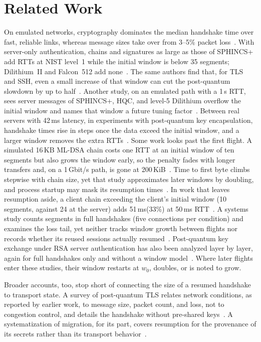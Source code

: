 \documentclass[sigconf,9pt,nonacm]{acmart}
\newcommand{\ms}{\,ms\xspace}
\begin{document}
\section{Related Work}\label{sec:related}
On emulated networks, cryptography dominates the median handshake time over fast, reliable links, whereas message sizes take over from 3--5\% packet loss~\cite{paquin2020}. With server-only authentication, chains and signatures as large as those of SPHINCS+ add RTTs at NIST level~1 while the initial window is below 35 segments; Dilithium~II and Falcon~512 add none~\cite{sikeridis2020}. The same authors find that, for TLS and SSH, even a small increase of that window can cut the post-quantum slowdown by up to half~\cite{sikeridis2020conext}. Another study, on an emulated path with a 1\,s RTT, sees server messages of SPHINCS+, HQC, and level-5 Dilithium overflow the initial window and names that window a future tuning factor~\cite{sosnowski2023}. Between real servers with 42\ms latency, in experiments with post-quantum key encapsulation, handshake times rise in steps once the data exceed the initial window, and a larger window removes the extra RTTs~\cite{henrich2025}. Some work looks past the first flight. A simulated 16\,KB ML-DSA chain costs one RTT at an initial window of ten segments but also grows the window early, so the penalty fades with longer transfers and, on a 1\,Gbit/s path, is gone at 200\,KiB~\cite{kampanakis2024}. Time to first byte climbs stepwise with chain size, yet that study approximates later windows by doubling, and process startup may mask its resumption times~\cite{chou2026}. In work that leaves resumption aside, a client chain exceeding the client's initial window (10 segments, against 24 at the server) adds 51\ms (33\%) at 50\ms RTT~\cite{anastasova2025}. A systems study counts segments in full handshakes (five connections per condition) and examines the loss tail, yet neither tracks window growth between flights nor records whether its reused sessions actually resumed~\cite{dubetskyy2026}. Post-quantum key exchange under RSA server authentication has also been analyzed layer by layer, again for full handshakes only and without a window model~\cite{gomez2026}. Where later flights enter these studies, their window restarts at $w_0$, doubles, or is noted to grow.

Broader accounts, too, stop short of connecting the size of a resumed handshake to transport state. A survey of post-quantum TLS relates network conditions, as reported by earlier work, to message size, packet count, and loss, not to congestion control, and details the handshake without pre-shared keys~\cite{alnahawi2024}. A systematization of migration, for its part, covers resumption for the provenance of its secrets rather than its transport behavior~\cite{roy2026}.
\end{document}
